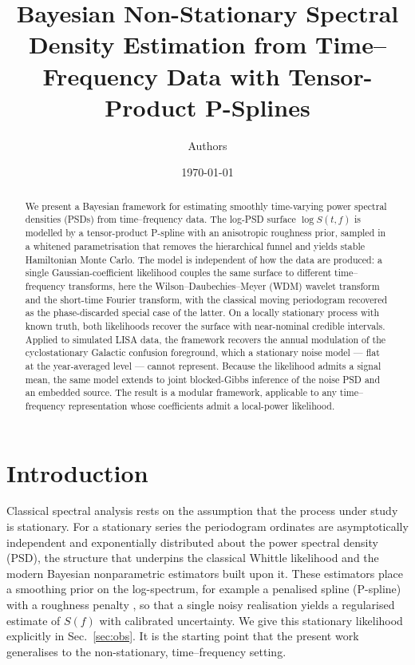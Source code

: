 \documentclass[
  aps,
  prd,
  twocolumn,
  amsmath,
  amssymb,
  nofootinbib,
  superscriptaddress,
  longbibliography,
]{revtex4-2}
\begin{document}
\title{Bayesian Non-Stationary Spectral Density Estimation
from Time--Frequency Data with Tensor-Product P-Splines}

\author{Authors}

\date{\today}

\begin{abstract}
We present a Bayesian framework for estimating smoothly time-varying power
spectral densities (PSDs) from time--frequency data. The log-PSD surface
$\log S(t,f)$ is modelled by a tensor-product P-spline with an anisotropic
roughness prior, sampled in a whitened parametrisation that removes the
hierarchical funnel and yields stable Hamiltonian Monte Carlo. The model is
independent of how the data are produced: a single Gaussian-coefficient
likelihood couples the same surface to different time--frequency transforms, here
the Wilson--Daubechies--Meyer (WDM) wavelet transform and the short-time Fourier
transform, with the classical moving periodogram recovered as the phase-discarded
special case of the latter. On a locally stationary process with known truth,
both likelihoods recover the surface with near-nominal credible intervals.
Applied to simulated LISA data, the framework recovers the annual modulation of
the cyclostationary Galactic confusion foreground, which a stationary noise model
--- flat at the year-averaged level --- cannot represent. Because the likelihood
admits a signal mean, the same model extends to joint blocked-Gibbs inference of
the noise PSD and an embedded source. The result is a modular framework,
applicable to any time--frequency representation whose coefficients admit a
local-power likelihood.
\end{abstract}

\maketitle

\section{Introduction}
\label{sec:intro}

Classical spectral analysis rests on the assumption that the process under study
is stationary. For a stationary series the periodogram ordinates are
asymptotically independent and exponentially distributed about the power spectral
density (PSD), the structure that underpins the classical Whittle likelihood
\citep{whittle1953analysis,pawitan1994nonparametric} and the modern Bayesian
nonparametric estimators built upon it. These estimators place a smoothing prior
on the log-spectrum, for example a penalised spline (P-spline) with a roughness
penalty \citep{maturana2021bayesian}, so that a single noisy realisation yields
a regularised estimate of $S(f)$ with calibrated uncertainty. We give this
stationary likelihood explicitly in Sec.~\ref{sec:obs}. It is the starting point
that the present work generalises to the non-stationary, time--frequency setting.
\end{document}
